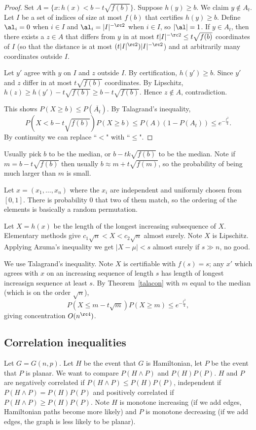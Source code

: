 \begin{proof}
Set $A=\{x:h(x)<b-t\sqrt{f(b)}\}$. Suppose $h(y)\ge b$. We claim $y\nin A_t$. Let $I$ be a set of indices of size at most $f(b)$ that certifies $h(y)\ge b$. Define $\al_i=0$ when $i\in I$ and $\al_i=|I|^{-\rc 2}$ when $i\in I$, so $|\al|=1$. If $y\in A_t$, then there exists a $z\in A$ that differs from $y$ in at most $t|I|^{-\rc2}\le t\sqrt{f(b)}$ coordinates of $I$ (so that the distance is at most $(t|I|^{\rc2})|I|^{-\rc2}$) and at arbitrarily many coordinates outside $I$.

Let $y'$ agree with $y$ on $I$ and $z$ outside $I$. By certification, $h(y')\ge b$. Since $y'$ and $z$ differ in at most $t\sqrt{f(b)}$ coordinates. By Lipschitz, $h(z)\ge h(y')-t\sqrt{f(b)}\ge b-t\sqrt{f(b)}$. Hence $z\nin A$, contradiction.

This shows $P(X\ge b)\le P(\overline{A_t})$. By Talagrand's inequality,
\[
P(X< b-t\sqrt{f(b)})P(X\ge b)\le P(A)(1-P(A_t))\le e^{-\frac{t^2}{4}}.
\]
By continuity we can replace ``$<$" with ``$\leq$".
\end{proof}
Usually pick $b$ to be the median, or $b-tk\sqrt{f(b)}$ to be the median. Note if $m=b-t\sqrt{f(b)}$ then usually $b\approx m+t\sqrt{f(m)}$, so the probability of being much larger than $m$ is small.

\begin{ex}
Let $x=(x_1,\ldots, x_n)$ where the $x_i$ are independent and uniformly chosen from $[0,1]$. There is probability 0 that two of them match, so the ordering of the elements is basically a random permutation.

Let $X=h(x)$ be the length of the longest increasing subsequence of $X$. Elementary methods give $c_1\sqrt{n}<X<c_2\sqrt n$ almost surely. Note $X$ is Lipschitz. Applying Azuma's inequality we get $|X-\mu|<s$ almost surely if $s\gg n$, no good.

We use Talagrand's inequality. Note $X$ is certifiable with $f(s)=s$; any $x'$ which agrees with $x$ on an increasing sequence of length $s$ has length of longest increasign sequence at least $s$. By Theorem~\ref{talacon} with $m$ equal to the median (which is on the order $\sqrt n$),
\[
P(X\le m-t\sqrt m)P(X\ge m)\le e^{-\frac{t^2}{4}},
\]
giving concentration $O(n^{\rc 4})$.
\end{ex}
\subsection{Correlation inequalities}
Let $G=G(n,p)$. Let $H$ be the event that $G$ is Hamiltonian, let $P$ be the event that $P$ is planar. We want to compare $P(H\wedge P)$ and $P(H)P(P)$. $H$ and $P$ are negatively correlated if $P(H\wedge P)\le P(H)P(P)$, independent if $P(H\wedge P)= P(H)P(P)$ and positively correlated if $P(H\wedge P)\ge P(H)P(P)$. 
Note $H$ is monotone increasing (if we add edges, Hamiltonian paths become more likely) and $P$ is monotone decreasing (if we add edges, the graph is less likely to be planar).

